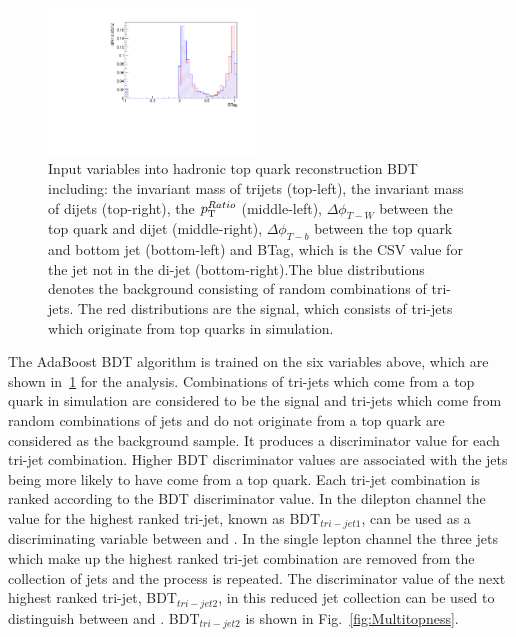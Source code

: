 \begin{figure}[ht!]
     \includegraphics[width=0.49\textwidth]{images/Run1/BTag.pdf}          
    \caption{Input variables into hadronic top quark reconstruction BDT including: the invariant mass of trijets (top-left), the invariant mass of dijets (top-right), the $p_{\mathrm{T}}^{Ratio}$ (middle-left), $\Delta\phi_{T-W}$ between the top quark and dijet (middle-right), $\Delta\phi_{T-b}$ between the top quark and bottom jet (bottom-left) and BTag, which is the CSV value for the jet not in the di-jet (bottom-right).The blue distributions denotes the background consisting of random combinations of tri-jets. The red distributions are the signal, which consists of tri-jets which originate from top quarks in simulation.}
    \label{fig:TopBDTinput}
\end{figure}

The AdaBoost BDT algorithm is trained on the six variables above, which are shown in~\ref{fig:TopBDTinput} for the \runone analysis. Combinations of tri-jets which come from a top quark in simulation are considered to be the signal and tri-jets which come from random combinations of jets and do not originate from a top quark are considered as the background sample. It produces a discriminator value for each tri-jet combination. Higher BDT discriminator values are associated with the jets being more likely to have come from a top quark. Each tri-jet combination is ranked according to the BDT discriminator value. In the dilepton channel the value for the highest ranked tri-jet, known as BDT$_{tri-jet1}$, can be used as a discriminating variable between \tttt and \ttbar. In the single lepton channel the three jets which make up the highest ranked tri-jet combination are removed from the collection of jets and the process is repeated. The discriminator value of the next highest ranked tri-jet, BDT$_{tri-jet2}$, in this reduced jet collection can be used to distinguish between \tttt and \ttbar. BDT$_{tri-jet2}$ is shown in Fig.~\ref{fig:Multitopness}.



